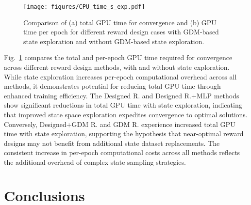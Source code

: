 \documentclass[comsoc,journal]{IEEEtran}
\begin{document}
\begin{figure}[!t]
    \centering
    \texttt{[image: figures/CPU\_time\_s\_exp.pdf]}
    \caption{Comparison of (a) total GPU time for convergence and (b) GPU time per epoch for different reward design cases with GDM-based state exploration and without GDM-based state exploration.
   }  
    \label{fig:state_exp_GPU_time}
\end{figure} 
Fig.~\ref{fig:state_exp_GPU_time} compares the total and per-epoch GPU time required for convergence across different reward design methods, with and without state exploration. While state exploration increases per-epoch computational overhead across all methods, it demonstrates potential for reducing total GPU time through enhanced training efficiency.
The Designed R. and Designed R.+MLP methods show significant reductions in total GPU time with state exploration, indicating that improved state space exploration expedites convergence to optimal solutions. Conversely, Designed+GDM R. and GDM R. experience increased total GPU time with state exploration, supporting the hypothesis that near-optimal reward designs may not benefit from additional state dataset replacements. The consistent increase in per-epoch computational costs across all methods reflects the additional overhead of complex state sampling strategies.
\vspace{-8pt}
\section{Conclusions}
\label{sec:conclusion}
 
\end{document}
